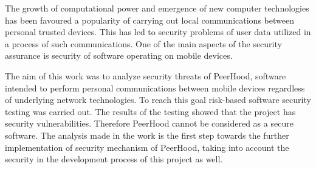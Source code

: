 %
The growth of computational power and emergence of new computer technologies has been favoured a popularity of carrying out local communications between personal trusted devices. 
%
This has led to security problems of user data utilized in a process of such communications. 
%
One of the main aspects of the security assurance is security of software operating on mobile devices. 

%
The aim of this work was to analyze security threats of PeerHood, software intended to perform personal communications between mobile devices regardless of underlying network technologies. 
%
To reach this goal risk-based software security testing was carried out. 
%
The results of the testing showed that the project has security vulnerabilities. 
%
Therefore PeerHood cannot be considered as a secure software. 
%
The analysis made in the work is the first step towards the further implementation of security mechanism of PeerHood, taking into account the security in the development process of this project as well. 